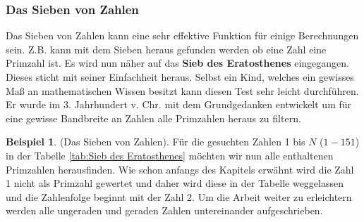 \documentclass[12pt,a4paper]{article}
\theoremstyle{definition}
\newtheorem{bsp}{Beispiel}[subsection]
\begin{document}
\subsubsection{Das Sieben von Zahlen}\label{Das Sieben von Zahlen}
Das Sieben von Zahlen kann eine sehr effektive Funktion für einige Berechnungen sein.
Z.B. kann mit dem Sieben heraus gefunden werden ob eine Zahl eine Primzahl ist.
Es wird nun näher auf das \textbf{Sieb des Eratosthenes} eingegangen.
Dieses sticht mit seiner Einfachheit heraus.
Selbst ein Kind, welches ein gewisses Maß an mathematischen Wissen besitzt kann diesen Test sehr leicht durchführen.
Er wurde im 3. Jahrhundert v. Chr. mit dem Grundgedanken entwickelt um für eine gewisse Bandbreite an Zahlen alle Primzahlen heraus zu filtern.

\begin{bsp}(Das Sieben von Zahlen).\newline
Für die gesuchten Zahlen 1 bis $N$ ($1-151$) in der Tabelle \ref{tab:Sieb des Eratosthenes} möchten wir nun alle enthaltenen Primzahlen herausfinden.
Wie schon anfangs des Kapitels erwähnt wird die Zahl 1 nicht als Primzahl gewertet und daher wird diese in der Tabelle weggelassen und die Zahlenfolge beginnt mit der Zahl 2.
Um die Arbeit weiter zu erleichtern werden alle ungeraden und geraden Zahlen untereinander aufgeschrieben.


\end{bsp}
\end{document}
